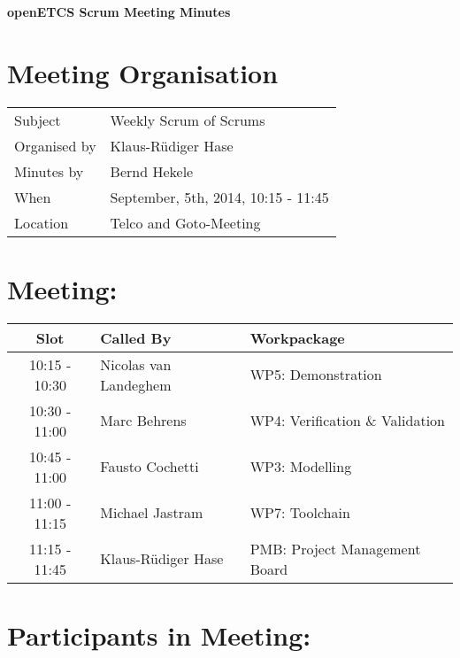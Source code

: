 \documentclass[a4paper, 11pt]{article}
\begin{document}
{\begin{center}\huge\bf openETCS Scrum Meeting Minutes\end{center}}
\section{Meeting Organisation}

\renewcommand{\arraystretch}{1.5}
\begin{supertabular}{m{.2\textwidth}m{.8\textwidth}}
Subject & Weekly Scrum of Scrums\\
Organised by &Klaus-R\"udiger Hase\\
Minutes by & Bernd Hekele\\
When & September, 5th, 2014, 10:15 - 11:45\\
Location & Telco and Goto-Meeting\\
\end{supertabular}

\renewcommand{\arraystretch}{1.0}
\section{Meeting:}

\begin{tabular}{|c|l|l|}
\hline
\textbf{Slot} &  \textbf{Called By} & \textbf{Workpackage} \\
\hline  
10:15 - 10:30 & Nicolas van Landeghem & WP5: Demonstration \\\hline  
10:30 - 11:00 & Marc Behrens & WP4: Verification \& Validation \\\hline  
10:45 - 11:00 & Fausto Cochetti & WP3: Modelling \\\hline  
11:00 - 11:15 & Michael Jastram & WP7: Toolchain \\\hline
11:15 - 11:45 & Klaus-R\"udiger Hase & PMB: Project Management Board \\\hline  
\end{tabular}

\section{Participants in Meeting:}
\end{document}
